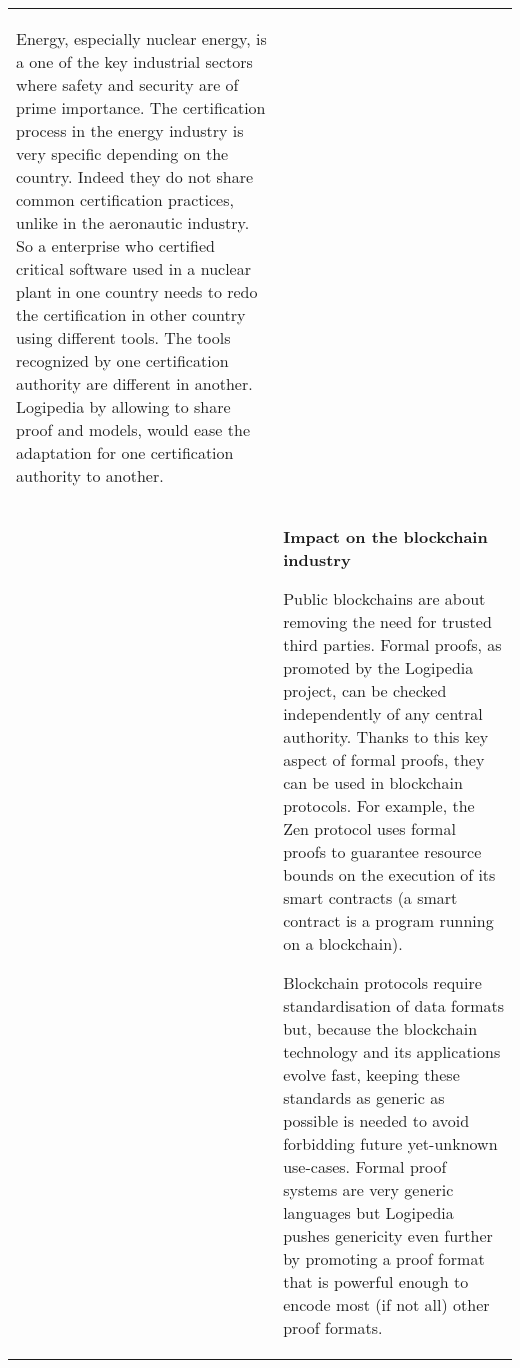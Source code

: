 \begin{longtable}{|p{}|p{}|}
\begin{framed}
Energy, especially nuclear energy, is a one of the key industrial
sectors where safety and security are of prime importance.  The
certification process in the energy industry is very specific
depending on the country. Indeed they do not share common
certification practices, unlike in the aeronautic industry. So a
enterprise who certified critical software used in a nuclear plant in one
country needs to redo the certification in other country using
different tools. The tools recognized by one certification authority
are different in another.  Logipedia by allowing to share proof and
models, would ease the adaptation for one certification authority to
another.
\end{framed}
\\
&
\begin{framed}
{\bf\large Impact on the blockchain industry}

Public blockchains are about removing the need for trusted third
parties. Formal proofs, as promoted by the Logipedia project, can be
checked independently of any central authority. Thanks to this key
aspect of formal proofs, they can be used in blockchain protocols. For
example, the Zen protocol\cite{zenprotocol_whitepaper} uses formal
proofs to guarantee resource bounds on the execution of its smart
contracts (a smart contract is a program running on a blockchain).


\hspace{0.4cm}
Blockchain protocols require standardisation of data formats but,
because the blockchain technology and its applications evolve fast,
keeping these standards as generic as possible is needed to avoid
forbidding future yet-unknown use-cases. Formal proof systems are very
generic languages but Logipedia pushes genericity even further by
promoting a proof format that is powerful enough to encode most (if
not all) other proof formats.


\end{framed}
\end{longtable}
